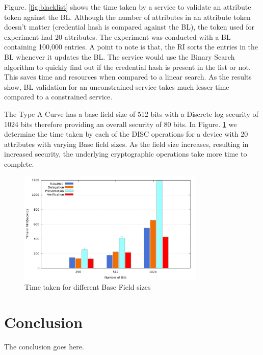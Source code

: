 \documentclass[journal]{IEEEtran}
\begin{document}
Figure. \ref{fig:blacklist} shows the time taken by a service to validate an attribute token against the BL. Although the number of attributes in an attribute token doesn't matter (credential hash is compared against the BL), the token used for experiment had 20 attributes. The experiment was conducted with a BL containing 100,000 entries. A point to note is that, the RI sorts the entries in the BL whenever it updates the BL. The service would use the Binary Search algorithm to quickly find out if the credential hash is present in the list or not. This saves time and resources when compared to a linear search. As the results show, BL validation for an unconstrained service takes much lesser time compared to a constrained service.

The Type A Curve \cite{curve} has a base field size of 512 bits with a Discrete log security of 1024 bits  therefore providing an overall security of 80 bits. In Figure. \ref{fig:security} we determine the time taken by each of the DISC operations for a device with 20 attributes with varying Base field sizes. As the field size increases, resulting in increased security, the underlying cryptographic operations take more time to complete.

\begin{figure}[htbp]
\centerline{\includegraphics[width=3.5in]{security.pdf}}
\caption{Time taken for different Base Field sizes}
\label{fig:security}
\end{figure}

\section{Conclusion}
The conclusion goes here.



\end{document}
